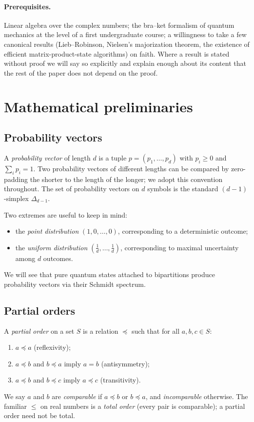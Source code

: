 \documentclass[11pt,a4paper]{article}
\theoremstyle{definition}
\theoremstyle{plain}
\theoremstyle{remark}
\begin{document}
\paragraph{Prerequisites.}
Linear algebra over the complex numbers; the bra--ket formalism of
quantum mechanics at the level of a first undergraduate course; a
willingness to take a few canonical results (Lieb--Robinson,
Nielsen's majorization theorem, the existence of efficient
matrix-product-state algorithms) on faith.  Where a result is stated
without proof we will say so explicitly and explain enough about its
content that the rest of the paper does not depend on the proof.

\section{Mathematical preliminaries}\label{sec:math}

\subsection{Probability vectors}

A \emph{probability vector} of length $d$ is a tuple
$p = (p_1, \ldots, p_d)$ with $p_i \ge 0$ and $\sum_i p_i = 1$.  Two
probability vectors of different lengths can be compared by
zero-padding the shorter to the length of the longer; we adopt this
convention throughout.  The set of probability vectors on $d$ symbols
is the standard $(d{-}1)$-simplex $\Delta_{d-1}$.

Two extremes are useful to keep in mind:
\begin{itemize}[nosep]
  \item the \emph{point distribution} $(1, 0, \ldots, 0)$, corresponding
        to a deterministic outcome;
  \item the \emph{uniform distribution} $(\tfrac1d, \ldots, \tfrac1d)$,
        corresponding to maximal uncertainty among $d$ outcomes.
\end{itemize}
We will see that pure quantum states attached to bipartitions produce
probability vectors via their Schmidt spectrum.

\subsection{Partial orders}

A \emph{partial order} on a set $S$ is a relation $\preceq$ such that for
all $a, b, c \in S$:
\begin{enumerate}[label=(\roman*),nosep]
  \item $a \preceq a$ (reflexivity);
  \item $a \preceq b$ and $b \preceq a$ imply $a = b$ (antisymmetry);
  \item $a \preceq b$ and $b \preceq c$ imply $a \preceq c$
        (transitivity).
\end{enumerate}
We say $a$ and $b$ are \emph{comparable} if $a \preceq b$ or
$b \preceq a$, and \emph{incomparable} otherwise.  The familiar
$\le$ on real numbers is a \emph{total order} (every pair is
comparable); a partial order need not be total.
\end{document}
